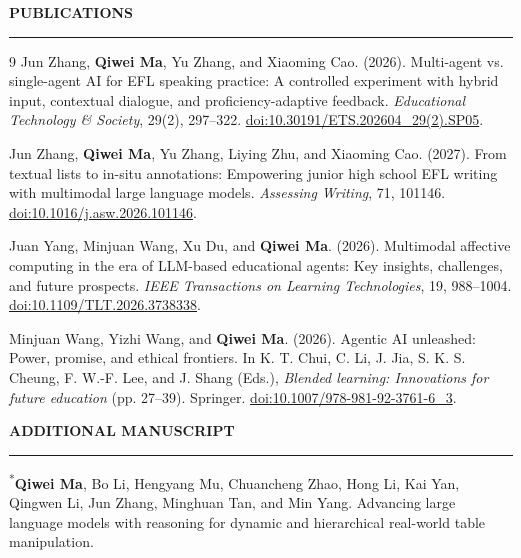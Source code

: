 \documentclass{resume} %
\renewenvironment{rSection}[1]{
  \sectionskip
  \textbf{\MakeUppercase{#1}}
  \sectionlineskip
  \hrule
  \begin{list}{}{
  \setlength{\leftmargin}{1.5em}
  }
  \item[]
  }{
  \end{list}
  }
\begin{document}
  \begin{rSection}{Publications}
  \itemsep -2pt

  \begingroup\small
  \renewcommand{\section}[2]{}
  \begin{thebibliography}{9}
  \setlength{\itemsep}{2pt}
  \setlength{\parskip}{0pt}
   Jun Zhang, \textbf{Qiwei Ma}, Yu Zhang, and Xiaoming Cao. (2026).
  Multi-agent vs. single-agent AI for EFL speaking practice: A controlled experiment with hybrid input,
  contextual dialogue, and proficiency-adaptive feedback. \emph{Educational Technology \& Society},
  29(2), 297--322. \href{https://doi.org/10.30191/ETS.202604_29(2).SP05}{doi:10.30191/ETS.202604\_29(2).SP05}.

   Jun Zhang, \textbf{Qiwei Ma}, Yu Zhang, Liying Zhu, and Xiaoming Cao. (2027).
  From textual lists to in-situ annotations: Empowering junior high school EFL writing with multimodal
  large language models. \emph{Assessing Writing}, 71, 101146.
  \href{https://doi.org/10.1016/j.asw.2026.101146}{doi:10.1016/j.asw.2026.101146}.

   Juan Yang, Minjuan Wang, Xu Du, and \textbf{Qiwei Ma}. (2026).
  Multimodal affective computing in the era of LLM-based educational agents: Key insights,
  challenges, and future prospects. \emph{IEEE Transactions on Learning Technologies}, 19, 988--1004.
  \href{https://doi.org/10.1109/TLT.2026.3738338}{doi:10.1109/TLT.2026.3738338}.

   Minjuan Wang, Yizhi Wang, and \textbf{Qiwei Ma}. (2026).
  Agentic AI unleashed: Power, promise, and ethical frontiers. In K. T. Chui, C. Li, J. Jia,
  S. K. S. Cheung, F. W.-F. Lee, and J. Shang (Eds.),
  \emph{Blended learning: Innovations for future education} (pp. 27--39). Springer.
  \href{https://doi.org/10.1007/978-981-92-3761-6_3}{doi:10.1007/978-981-92-3761-6\_3}.
  \end{thebibliography}
  \endgroup
  \end{rSection}


  \begin{rSection}{Additional Manuscript}
  \textsuperscript{*}\textbf{Qiwei Ma}, Bo Li, Hengyang Mu, Chuancheng Zhao, Hong Li, Kai Yan,
  Qingwen Li, Jun Zhang, Minghuan Tan, and Min Yang.
  Advancing large language models with reasoning for dynamic and hierarchical real-world table manipulation.
  \end{rSection}
\end{document}
